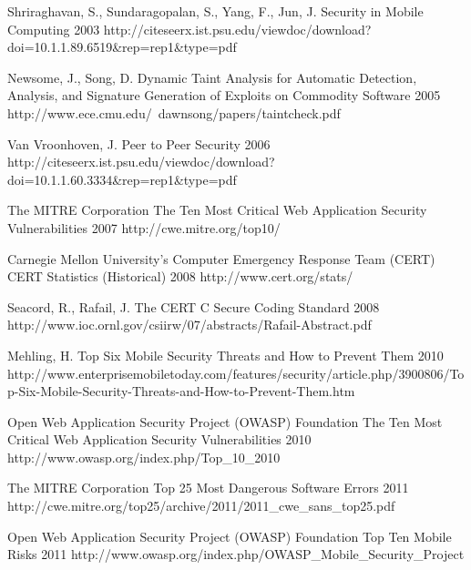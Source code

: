 \begin{thebibliography}{9}
		{Shriraghavan, S., Sundaragopalan, S., Yang, F., Jun, J.} %
		{Security in Mobile Computing}	
		{2003}	
		{http://citeseerx.ist.psu.edu/viewdoc/download?doi=10.1.1.89.6519\&rep=rep1\&type=pdf}

		{Newsome, J., Song, D.} %
		{Dynamic Taint Analysis for Automatic Detection, Analysis, and Signature Generation of Exploits on Commodity Software}	
		{2005}	
		{http://www.ece.cmu.edu/~dawnsong/papers/taintcheck.pdf}
	
		{Van Vroonhoven, J.} %
		{Peer to Peer Security}	
		{2006}
		{http://citeseerx.ist.psu.edu/viewdoc/download?doi=10.1.1.60.3334\&rep=rep1\&type=pdf}

		{The MITRE Corporation}
		{The Ten Most Critical Web Application Security Vulnerabilities}
		{2007}
		{http://cwe.mitre.org/top10/}

		{Carnegie Mellon University's Computer Emergency Response Team (CERT)}
		{CERT Statistics (Historical)}
		{2008}
		{http://www.cert.org/stats/}
				
		{Seacord, R., Rafail, J.} %
		{The {CERT} {C} Secure Coding Standard}
		{2008}
		{http://www.ioc.ornl.gov/csiirw/07/abstracts/Rafail-Abstract.pdf}
		
		{Mehling, H.} %
		{Top Six Mobile Security Threats and How to Prevent Them}
		{2010}
		{http://www.enterprisemobiletoday.com/features/security/article.php/3900806/Top-Six-Mobile-Security-Threats-and-How-to-Prevent-Them.htm}
		
		{Open Web Application Security Project (OWASP) Foundation}
		{The Ten Most Critical Web Application Security Vulnerabilities}
		{2010}
		{http://www.owasp.org/index.php/Top_10_2010}
	
		{The MITRE Corporation}
		{Top 25 Most Dangerous Software Errors}
		{2011}
		{http://cwe.mitre.org/top25/archive/2011/2011_cwe_sans_top25.pdf}
		
		{Open Web Application Security Project (OWASP) Foundation}
		{Top Ten Mobile Risks}
		{2011}
		{http://www.owasp.org/index.php/OWASP_Mobile_Security_Project}


\end{thebibliography}
